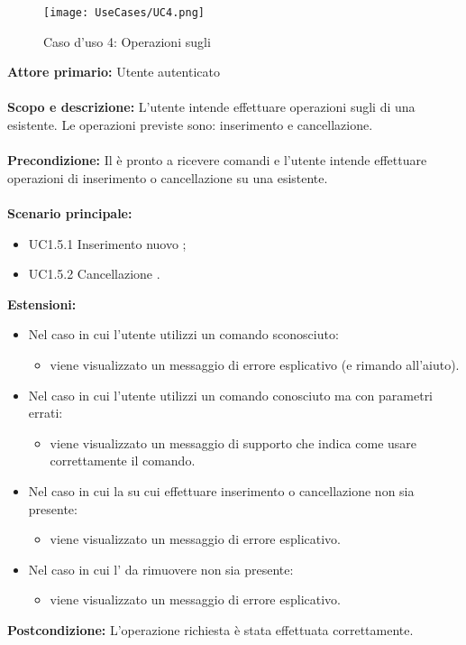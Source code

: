 \documentclass{scalatekids-article}
\begin{document}
\begin{figure}[H]
  \begin{center}
    \texttt{[image: UseCases/UC4.png]}
    \caption*{Caso d'uso 4: Operazioni sugli }
  \end{center}
\end{figure}
\textbf{Attore primario:} Utente autenticato\\ \\
\textbf{Scopo e descrizione:} L'utente intende effettuare operazioni sugli  di una  esistente. Le operazioni previste sono:
inserimento e cancellazione.\\ \\
\textbf{Precondizione:} Il  è pronto a ricevere comandi e l'utente intende effettuare operazioni di inserimento o cancellazione su una  esistente.\\ \\
\textbf{Scenario principale:}
\begin{itemize}
\item UC1.5.1 Inserimento nuovo ;
\item UC1.5.2 Cancellazione .
\end{itemize}
\textbf{Estensioni:}
\begin{itemize}
\item Nel caso in cui l'utente utilizzi un comando sconosciuto:
  \begin{itemize}
  \item viene visualizzato un messaggio di errore esplicativo (e rimando all'aiuto).
  \end{itemize}
\item Nel caso in cui l'utente utilizzi un comando conosciuto ma con parametri errati:
  \begin{itemize}
  \item viene visualizzato un messaggio di supporto che indica come usare correttamente il comando.
  \end{itemize}
\item Nel caso in cui la  su cui effettuare inserimento o cancellazione non sia presente:
  \begin{itemize}
  \item viene visualizzato un messaggio di errore esplicativo.
  \end{itemize}
\item Nel caso in cui l' da rimuovere non sia presente:
  \begin{itemize}
  \item viene visualizzato un messaggio di errore esplicativo.
  \end{itemize}
\end{itemize}
\textbf{Postcondizione:} L'operazione richiesta è stata effettuata correttamente.
\end{document}

